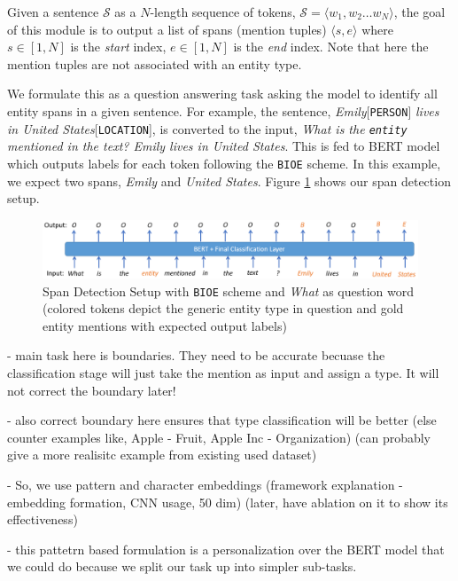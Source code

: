 Given a sentence $\mathcal{S}$ as a $N$-length sequence of tokens, $\mathcal{S} = \langle w_1, w_2 \ldots w_N \rangle$, the goal of this module is to output a list of spans (mention tuples) $\langle s, e\rangle$ where $s \in [1, N]$ is the \textit{start} index, $e \in [1, N]$ is the \textit{end} index. Note that here the mention tuples are not associated with an entity type. 

We formulate this as a question answering task asking the model to identify all entity spans in a given sentence. For example, the sentence, \textit{Emily}[\texttt{PERSON}] \textit{lives in United States}[\texttt{LOCATION}], is converted to the input, \textit{What is the \texttt{entity} mentioned in the text? Emily lives in United States}. This is fed to BERT model which outputs labels for each token following the \texttt{BIOE} scheme. In this example, we expect two spans, \textit{Emily} and \textit{United States}. Figure \ref{fig:span_detection} shows our span detection setup.

\begin{figure}
    \centering
    \includegraphics[width=\linewidth]{resources/span_detection}
    \caption{Span Detection Setup with \texttt{BIOE} scheme and \textit{What} as question word (colored tokens depict the generic entity type in question and gold entity mentions with expected output labels)}
    \label{fig:span_detection}
\end{figure}

- main task here is boundaries. They need to be accurate becuase the classification stage will just take the mention as input and assign a type. It will not correct the boundary later!

- also correct boundary here ensures that type classification will be better (else counter examples like, Apple - Fruit, Apple Inc - Organization) (can probably give a more realisitc example from existing used dataset)

- So, we use pattern and character embeddings (framework explanation - embedding formation, CNN usage, 50 dim) (later, have ablation on it to show its effectiveness)

- this pattetrn based formulation is a personalization over the BERT model that we could do because we split our task up into simpler sub-tasks.

